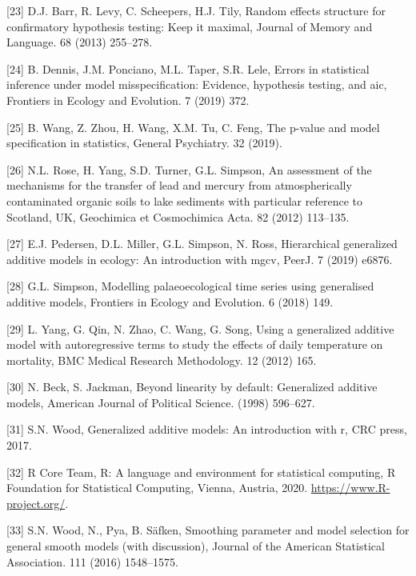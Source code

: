 \documentclass[
]{article}
\begin{document}
\leavevmode\hypertarget{ref-barr2013}{}%
{[}23{]} D.J. Barr, R. Levy, C. Scheepers, H.J. Tily, Random effects structure for confirmatory hypothesis testing: Keep it maximal, Journal of Memory and Language. 68 (2013) 255--278.

\leavevmode\hypertarget{ref-dennis2019}{}%
{[}24{]} B. Dennis, J.M. Ponciano, M.L. Taper, S.R. Lele, Errors in statistical inference under model misspecification: Evidence, hypothesis testing, and aic, Frontiers in Ecology and Evolution. 7 (2019) 372.

\leavevmode\hypertarget{ref-wang2019}{}%
{[}25{]} B. Wang, Z. Zhou, H. Wang, X.M. Tu, C. Feng, The p-value and model specification in statistics, General Psychiatry. 32 (2019).

\leavevmode\hypertarget{ref-rose2012}{}%
{[}26{]} N.L. Rose, H. Yang, S.D. Turner, G.L. Simpson, An assessment of the mechanisms for the transfer of lead and mercury from atmospherically contaminated organic soils to lake sediments with particular reference to Scotland, UK, Geochimica et Cosmochimica Acta. 82 (2012) 113--135.

\leavevmode\hypertarget{ref-pedersen2019}{}%
{[}27{]} E.J. Pedersen, D.L. Miller, G.L. Simpson, N. Ross, Hierarchical generalized additive models in ecology: An introduction with mgcv, PeerJ. 7 (2019) e6876.

\leavevmode\hypertarget{ref-simpson2018}{}%
{[}28{]} G.L. Simpson, Modelling palaeoecological time series using generalised additive models, Frontiers in Ecology and Evolution. 6 (2018) 149.

\leavevmode\hypertarget{ref-yang2012}{}%
{[}29{]} L. Yang, G. Qin, N. Zhao, C. Wang, G. Song, Using a generalized additive model with autoregressive terms to study the effects of daily temperature on mortality, BMC Medical Research Methodology. 12 (2012) 165.

\leavevmode\hypertarget{ref-beck1998}{}%
{[}30{]} N. Beck, S. Jackman, Beyond linearity by default: Generalized additive models, American Journal of Political Science. (1998) 596--627.

\leavevmode\hypertarget{ref-wood2017}{}%
{[}31{]} S.N. Wood, Generalized additive models: An introduction with r, CRC press, 2017.

\leavevmode\hypertarget{ref-r}{}%
{[}32{]} R Core Team, R: A language and environment for statistical computing, R Foundation for Statistical Computing, Vienna, Austria, 2020. \url{https://www.R-project.org/}.

\leavevmode\hypertarget{ref-wood2016}{}%
{[}33{]} S.N. Wood, N., Pya, B. Säfken, Smoothing parameter and model selection for general smooth models (with discussion), Journal of the American Statistical Association. 111 (2016) 1548--1575.
\end{document}
